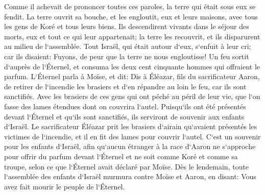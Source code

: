 \verse Comme il achevait de prononcer toutes ces paroles, la terre qui était sous eux se fendit. 
\verse La terre ouvrit sa bouche, et les engloutit, eux et leurs maisons, avec tous les gens de Koré et tous leurs biens. 
\verse Ils descendirent vivants dans le séjour des morts, eux et tout ce qui leur appartenait; la terre les recouvrit, et ils disparurent au milieu de l`assemblée. 
\verse Tout Israël, qui était autour d`eux, s`enfuit à leur cri; car ils disaient: Fuyons, de peur que la terre ne nous engloutisse! 
\verse Un feu sortit d`auprès de l`Éternel, et consuma les deux cent cinquante hommes qui offraient le parfum. 
\verse L`Éternel parla à Moïse, et dit: 
\verse Dis à Éléazar, fils du sacrificateur Aaron, de retirer de l`incendie les brasiers et d`en répandre au loin le feu, car ils sont sanctifiés. 
\verse Avec les brasiers de ces gens qui ont péché au péril de leur vie, que l`on fasse des lames étendues dont on couvrira l`autel. Puisqu`ils ont été présentés devant l`Éternel et qu`ils sont sanctifiés, ils serviront de souvenir aux enfants d`Israël. 
\verse Le sacrificateur Éléazar prit les brasiers d`airain qu`avaient présentés les victimes de l`incendie, et il en fit des lames pour couvrir l`autel. 
\verse C`est un souvenir pour les enfants d`Israël, afin qu`aucun étranger à la race d`Aaron ne s`approche pour offrir du parfum devant l`Éternel et ne soit comme Koré et comme sa troupe, selon ce que l`Éternel avait déclaré par Moïse. 
\verse Dès le lendemain, toute l`assemblée des enfants d`Israël murmura contre Moïse et Aaron, en disant: Vous avez fait mourir le peuple de l`Éternel. 
